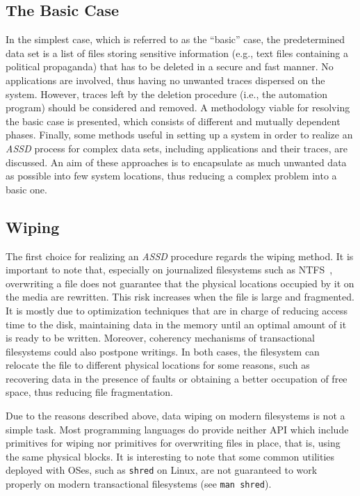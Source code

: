 \documentclass[10pt, conference, compsocconf]{IEEEtran}
\newcommand{\assd}{\emph{ASSD}\xspace}
\begin{document}
\subsection{The Basic Case}
\label{basic}
In the simplest case, which is referred to as the ``basic'' case, the predetermined data set is a list of files storing sensitive information (e.g., text files containing a political propaganda) that has to be deleted in a secure and fast manner. No applications are involved, thus having no unwanted traces dispersed on the system. However, traces left by the deletion procedure (i.e., the automation program) should be considered and removed.
A methodology viable for resolving the basic case is presented, which consists of different and mutually dependent phases. Finally, some methods useful in setting up a system in order to realize an \assd process for complex data sets, including applications and their traces, are discussed. An aim of these approaches is to encapsulate as much unwanted data as possible into few system locations, thus reducing a complex problem into a basic one.


\subsection{Wiping}
\label{ramethod}
The first choice for realizing an \assd procedure regards the wiping method.
It is important to note that, especially on journalized filesystems such as NTFS~\cite{ntfs}, overwriting a file does not guarantee that the physical locations occupied by it on the media are rewritten. This risk increases when the file is large and fragmented.
It is mostly due to optimization techniques that are in charge of reducing access time to the disk, maintaining data in the memory until an optimal amount of it is ready to be written. Moreover, coherency mechanisms of transactional filesystems could also postpone writings.
In both cases, the filesystem can relocate the file to different physical locations for some reasons, such as recovering data in the presence of faults or obtaining a better occupation of free space, thus reducing file fragmentation.

Due to the reasons described above, data wiping on modern filesystems is not a simple task. Most programming languages do provide neither API which include primitives for wiping nor primitives for overwriting files in place, that is, using the same physical blocks. It is interesting to note that some common utilities deployed with OSes, such as \verb=shred= on Linux, are not guaranteed to work properly on modern transactional filesystems (see \verb=man shred=).
\end{document}
